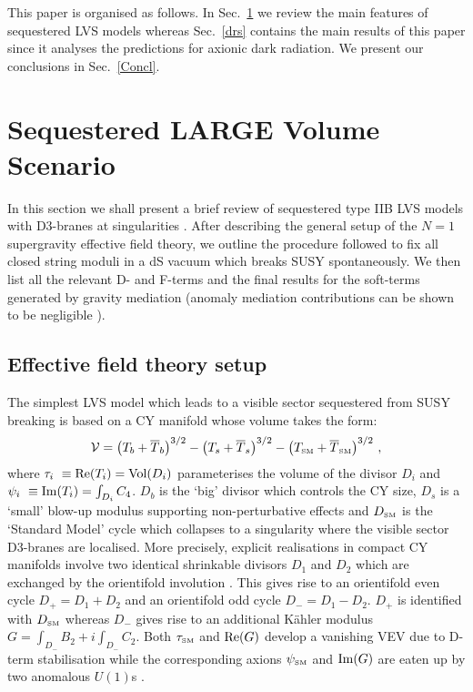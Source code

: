 \documentclass[11pt,a4paper]{article}
\newcommand{\be}{\begin{equation}}
\newcommand{\ee}{\end{equation}}
\def\SM{{\scriptscriptstyle \rm SM}}
\newcommand\vo{{\mathcal{V}}}
\begin{document}
This paper is organised as follows. In Sec.~\ref{LVSs} we review the main features of sequestered LVS models whereas Sec.~\ref{drs} contains the main results of this paper since it analyses the predictions for axionic dark radiation. We present our conclusions in Sec.~\ref{Concl}.

\section{Sequestered LARGE Volume Scenario}
\label{LVSs}

In this section we shall present a brief review of sequestered type IIB LVS models with D3-branes at singularities \cite{CYembedding, SeqLVS, SoftTermsSeqLVS}. After describing the general setup of the $N=1$ supergravity effective field theory, we outline the procedure followed to fix all closed string moduli in a dS vacuum which breaks SUSY spontaneously. We then list all the relevant D- and F-terms and the final results for the soft-terms generated by gravity mediation (anomaly mediation contributions can be shown to be negligible \cite{SeqLVS, SoftTermsSeqLVS}).


\subsection{Effective field theory setup}

The simplest LVS model which leads to a visible sector sequestered from SUSY breaking is based on a CY manifold whose volume takes the form:
\be
\vo = \left(T_b+\overline{T}_b\right)^{3/2} - \left(T_s+\overline{T}_s\right)^{3/2} - \left(T_\SM+\overline{T}_\SM\right)^{3/2}\,,
\ee
where $\tau_i~\equiv {\rm Re} (T_i) = {\rm Vol}(D_i)$ parameterises the volume of the divisor $D_i$ and $\psi_i~\equiv {\rm Im}(T_i) = \int_{D_i} C_4$. $D_b$ is the `big' divisor which controls the CY size, $D_s$ is a `small' blow-up modulus supporting non-perturbative effects and $D_\SM$ is the `Standard Model' cycle which collapses to a singularity where the visible sector D3-branes are localised. More precisely, explicit realisations in compact CY manifolds involve two identical shrinkable divisors $D_1$ and $D_2$ which are exchanged by the orientifold involution \cite{CYembedding}. This gives rise to an orientifold even cycle $D_+=D_1+D_2$ and an orientifold odd cycle $D_-=D_1-D_2$. $D_+$ is identified with $D_\SM$ whereas $D_-$ gives rise to an additional K\"ahler modulus $G= \int_{D_-} B_2 +i \int_{D_-} C_2$. Both $\tau_\SM$ and ${\rm Re}(G)$ develop a vanishing VEV due to D-term stabilisation while the corresponding axions $\psi_\SM$ and ${\rm Im}(G)$ are eaten up by two anomalous $U(1)$s \cite{Conlon:2008wa}. 
\end{document}
